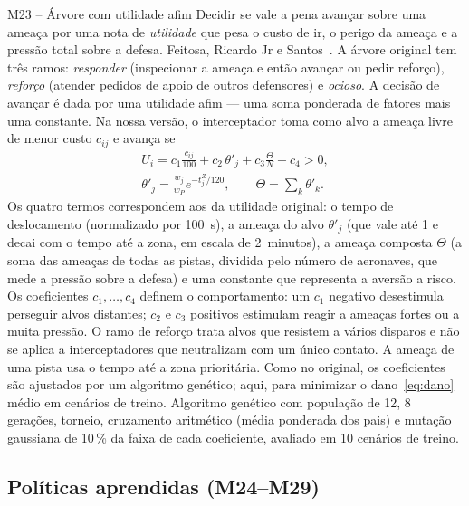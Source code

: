 \begin{metodo}{M23 -- Árvore com utilidade afim}
\ideia Decidir se vale a pena avançar sobre uma ameaça por uma nota de \emph{utilidade} que pesa o custo de ir, o perigo
da ameaça e a pressão total sobre a defesa.
\orig Feitosa, Ricardo Jr e Santos~\cite{feitosa2025}.
\func A árvore original tem três ramos: \emph{responder} (inspecionar a ameaça e então avançar ou pedir reforço),
\emph{reforço} (atender pedidos de apoio de outros defensores) e \emph{ocioso}. A decisão de avançar é dada por uma
utilidade afim --- uma soma ponderada de fatores mais uma constante. Na nossa versão, o interceptador toma como alvo a
ameaça livre de menor custo $c_{ij}$ e avança se
\begin{equation}
  \begin{gathered}
  U_i = c_1\frac{c_{ij}}{100} + c_2\,\theta'_j + c_3\frac{\Theta}{N} + c_4 > 0,\\
  \theta'_j=\frac{w_j}{w_P}e^{-t^Z_j/120},\qquad \Theta=\sum_{k}\theta'_k .
  \end{gathered}
  \label{eq:util}
\end{equation}
Os quatro termos correspondem aos da utilidade original: o tempo de deslocamento (normalizado por 100~s), a ameaça do alvo
$\theta'_j$ (que vale até 1 e decai com o tempo até a zona, em escala de 2~minutos), a ameaça composta $\Theta$ (a soma das
ameaças de todas as pistas, dividida pelo número de aeronaves, que mede a pressão sobre a defesa) e uma constante que
representa a aversão a risco. Os coeficientes $c_1,\dots,c_4$ definem o comportamento: um $c_1$ negativo desestimula
perseguir alvos distantes; $c_2$ e $c_3$ positivos estimulam reagir a ameaças fortes ou a muita pressão.
\adap O ramo de reforço trata alvos que resistem a vários disparos e não se aplica a interceptadores que neutralizam com um
único contato. A ameaça de uma pista usa o tempo até a zona prioritária. Como no original, os coeficientes são ajustados
por um algoritmo genético; aqui, para minimizar o dano~\eqref{eq:dano} médio em cenários de treino.
\parm Algoritmo genético com população de 12, 8 gerações, torneio, cruzamento aritmético (média ponderada dos pais) e
mutação gaussiana de 10\,\% da faixa de cada coeficiente, avaliado em 10 cenários de treino.
\end{metodo}

\subsection{Políticas aprendidas (M24--M29)}\label{sec:redes}

